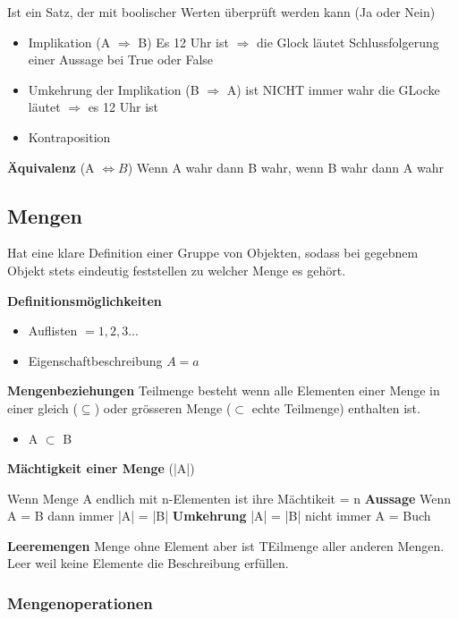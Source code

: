 Ist ein Satz, der mit boolischer Werten überprüft werden kann (Ja oder Nein)

\begin{itemize}
    \item Implikation (A $\Rightarrow $ B)
    \subitem Es 12 Uhr ist $\Rightarrow$ die Glock läutet 
    \subitem Schlussfolgerung einer Aussage bei True oder False
    \item Umkehrung der Implikation (B $\Rightarrow$ A) ist NICHT immer wahr 
    \subitem die GLocke läutet $\Rightarrow$ es 12 Uhr ist 
    \item Kontraposition 
\end{itemize}

\textbf{Äquivalenz} (A $\Leftrightarrow B$)
Wenn A wahr dann B wahr, wenn B wahr dann A wahr

\subsection{Mengen}
Hat eine klare Definition einer Gruppe von Objekten, sodass bei gegebnem Objekt stets eindeutig feststellen zu welcher Menge es gehört.

\textbf{Definitionsmöglichkeiten}
\begin{itemize}
    \item Auflisten
    \subitem $ = {1,2,3...}$
    \item Eigenschaftbeschreibung
    \subitem $A = {a }$ 
\end{itemize}

\textbf{Mengenbeziehungen}
Teilmenge besteht wenn alle Elementen einer Menge in einer gleich ($\subseteq$) oder grösseren Menge ($\subset$ echte Teilmenge) enthalten ist.

\begin{itemize}
    \item A $\subset$ B
\end{itemize}

\textbf{Mächtigkeit einer Menge} (|A|)

Wenn Menge A endlich mit n-Elementen ist ihre Mächtikeit = n
\textbf{Aussage}
Wenn A = B dann immer |A| = |B|
\textbf{Umkehrung}
|A| = |B| nicht immer A = Buch

\textbf{Leeremengen}
Menge ohne Element aber ist TEilmenge aller anderen Mengen. Leer weil keine Elemente die Beschreibung erfüllen.

\subsubsection{Mengenoperationen}

